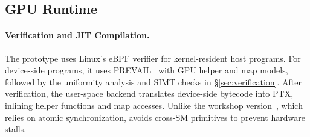 \subsection{GPU Runtime}
\label{sec:impl-gpu}

\paragraph{Verification and JIT Compilation.}
The prototype uses Linux's eBPF verifier for kernel-resident host programs.
For device-side programs, it uses PREVAIL~\cite{gershuni2019prevail,prevail-verifier} with GPU helper and map models, followed by the uniformity analysis and SIMT checks in \S\ref{sec:verification}.
After verification, the user-space backend translates device-side bytecode into PTX, inlining helper functions and map accesses.
Unlike the workshop version~\cite{egpu}, which relies on atomic synchronization, \sys{} avoids cross-SM primitives to prevent hardware stalls.


